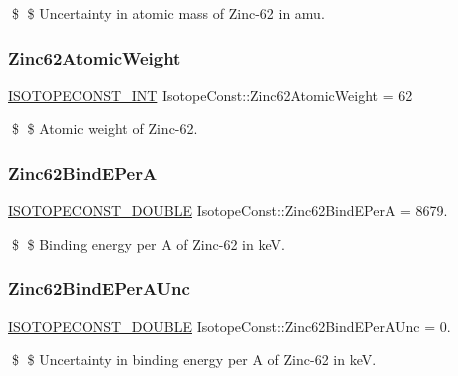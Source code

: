 \$ \$ Uncertainty in atomic mass of Zinc-\/62 in amu. \mbox{\label{group___isotope_const-_zinc-_zn62_gad3f0229c7910c179277b7816dce76b1c}} 
\subsubsection{\texorpdfstring{Zinc62\+Atomic\+Weight}{Zinc62AtomicWeight}}
{\footnotesize\ttfamily \mbox{\hyperlink{group___isotope_const-_macros_ga5f18360b3e99483a35c32d789e62621c}{I\+S\+O\+T\+O\+P\+E\+C\+O\+N\+S\+T\+\_\+\+I\+NT}} Isotope\+Const\+::\+Zinc62\+Atomic\+Weight = 62}

\$ \$ Atomic weight of Zinc-\/62. \mbox{\label{group___isotope_const-_zinc-_zn62_ga8a6341826f4ca38e40ef8d7ef897dbdb}} 
\subsubsection{\texorpdfstring{Zinc62\+Bind\+E\+PerA}{Zinc62BindEPerA}}
{\footnotesize\ttfamily \mbox{\hyperlink{group___isotope_const-_macros_ga8f45a7272ce02c0b4c65c44636ed719a}{I\+S\+O\+T\+O\+P\+E\+C\+O\+N\+S\+T\+\_\+\+D\+O\+U\+B\+LE}} Isotope\+Const\+::\+Zinc62\+Bind\+E\+PerA = 8679.}

\$ \$ Binding energy per A of Zinc-\/62 in keV. \mbox{\label{group___isotope_const-_zinc-_zn62_gae633f7e42c90d1babd6bddb6eb307ec2}} 
\subsubsection{\texorpdfstring{Zinc62\+Bind\+E\+Per\+A\+Unc}{Zinc62BindEPerAUnc}}
{\footnotesize\ttfamily \mbox{\hyperlink{group___isotope_const-_macros_ga8f45a7272ce02c0b4c65c44636ed719a}{I\+S\+O\+T\+O\+P\+E\+C\+O\+N\+S\+T\+\_\+\+D\+O\+U\+B\+LE}} Isotope\+Const\+::\+Zinc62\+Bind\+E\+Per\+A\+Unc = 0.}

\$ \$ Uncertainty in binding energy per A of Zinc-\/62 in keV. \mbox{\label{group___isotope_const-_zinc-_zn62_ga7eced16f5a9d6bedcaa43e45fe1f2348}} 

